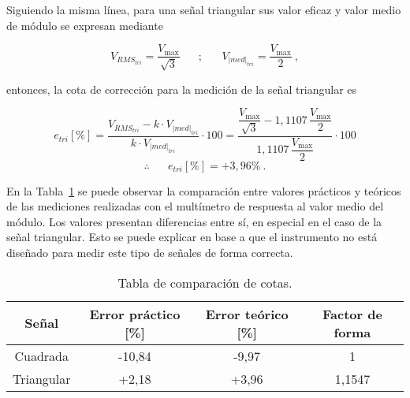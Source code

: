     Siguiendo la misma línea, para una señal triangular sus valor eficaz y valor
    medio de módulo se expresan mediante

    \vspace{-5pt}
$$ V_{RMS_{tri}} = \dfrac{V_{\max}}{\sqrt{3}} \hspace{20pt} ; \hspace{20pt} V_{|med|_{tri}} = \dfrac{V_{\max}}{2}~, $$

    \noindent entonces, la cota de corrección para la medición de 
    la señal triangular es

    \vspace{-5pt}
    $$ e_{tri} [\%] = \dfrac{V_{RMS_{tri}} - k\cdot V_{|med|_{tri}}}{k \cdot V_{|med|_{tri}}} \cdot 100
    = \dfrac{ \dfrac{V_{\max}}{\sqrt{3}} - 1,1107\, \dfrac{V_{\max}}{2}}{1,1107\, \dfrac{V_{\max}}{2}} \cdot 100 $$
              $$  \therefore \hspace{20pt} \boxed{e_{tri}[\%] = +3,96\%}~.
    $$

    En la Tabla~\ref{tab:ComparacionCotas} se puede observar la comparación entre valores
    prácticos y teóricos de las mediciones realizadas con el multímetro de respuesta al 
    valor medio del módulo. Los valores presentan diferencias entre sí, en especial
    en el caso de la señal triangular. Esto se puede explicar en base a que el
    instrumento no está diseñado para medir este tipo de señales de forma correcta. 

    \begin{table}[H] \centering
      \begin{tabular}{|c|c|c|c|} \hline
        \textbf{Señal}       & \textbf{Error práctico [\%]}  & \textbf{Error teórico [\%]} & \textbf{Factor de forma} \\ \hline
        Cuadrada    & -10,84               & -9,97              &  1              \\ \hline
        Triangular  & +2,18                & +3,96              &  1,1547         \\ \hline
      \end{tabular}
      \caption{Tabla de comparación de cotas.}
      \label{tab:ComparacionCotas}
    \end{table}









